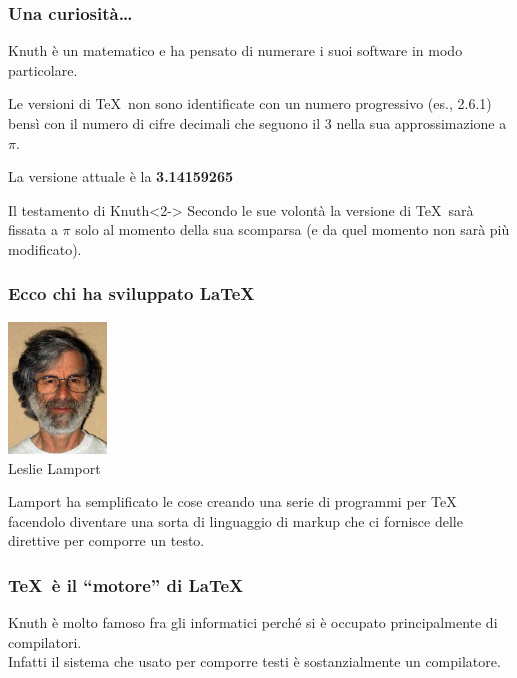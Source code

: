 \documentclass[10pt,svgnames,%
ucs,%
pdftex]{mybeamer}
\begin{document}
\begin{frame}
	\frametitle{Una curiosit\`a\dots}
	Knuth è un matematico e ha pensato di numerare i suoi software in modo particolare.
	\bigskip
	
	Le versioni di \TeX\ non sono identificate con un numero progressivo 
	(es., 2.6.1) bens\`i con il numero di cifre decimali che
	seguono il 3 nella sua approssimazione a $\pi$.
	\begin{block}{}
		\begin{center}
			La versione attuale \`e la \textbf{3.14159265}
		\end{center}
	\end{block}
	\bigskip 
	\begin{block}{Il testamento di Knuth}<2->
		Secondo le sue volont\`a la versione di \TeX\ sar\`a fissata a $\pi$ solo
		al momento della sua scomparsa (e da quel momento non sar\`a pi\`u
		modificato).
	\end{block}
\end{frame}
\begin{frame}
	\frametitle{Ecco chi ha sviluppato \LaTeX}
	\begin{center}
		\includegraphics[height=3.5cm]{img/lamport}\\[2mm]
		\large Leslie Lamport
	\end{center}
	\begin{block}{}
		Lamport ha semplificato le cose creando una serie di programmi per \TeX\, facendolo diventare una sorta di linguaggio di markup che ci fornisce delle direttive per comporre un testo.
	\end{block}
\end{frame}

\begin{frame}
	\frametitle{\TeX\ \`e il ``motore'' di \LaTeX}
	\begin{block}{}
		Knuth è molto famoso fra gli informatici perché si è occupato principalmente di compilatori.
		\\	
		Infatti il sistema che usato per comporre testi è sostanzialmente un compilatore.
	\end{block}
\end{frame}
\end{document}
